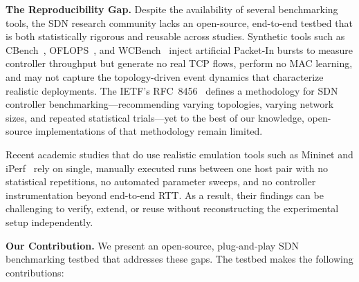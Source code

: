 \documentclass[conference]{IEEEtran}
\begin{document}
\textbf{The Reproducibility Gap.}
Despite the availability of several benchmarking tools, the SDN
research community lacks an open-source, end-to-end testbed that is
both statistically rigorous and reusable across studies.
Synthetic tools such as CBench~\cite{cbench2012},
OFLOPS~\cite{Rotsos2012OFLOPS}, and
WCBench~\cite{wcbench2015} inject artificial Packet-In bursts
to measure controller throughput but generate no real TCP flows,
perform no MAC learning, and may not capture the topology-driven
event dynamics that characterize realistic deployments.
The IETF's RFC~8456~\cite{rfc8456} defines a methodology for
SDN controller benchmarking---recommending varying topologies,
varying network sizes, and repeated statistical trials---yet
to the best of our knowledge, open-source implementations of
that methodology remain limited.

Recent academic studies that do use realistic emulation tools
such as Mininet and iPerf~\cite{Koulouras2022RealWorld,
Cabarkapa2022TreeTopology, Ali2024Comparison} rely on single,
manually executed runs between one host pair with no statistical
repetitions, no automated parameter sweeps, and no controller
instrumentation beyond end-to-end RTT. As a result, their
findings can be challenging to verify, extend, or reuse without
reconstructing the experimental setup independently.

\textbf{Our Contribution.}
We present an open-source, plug-and-play SDN benchmarking
testbed that addresses these gaps. The testbed makes the following
contributions:
\end{document}
